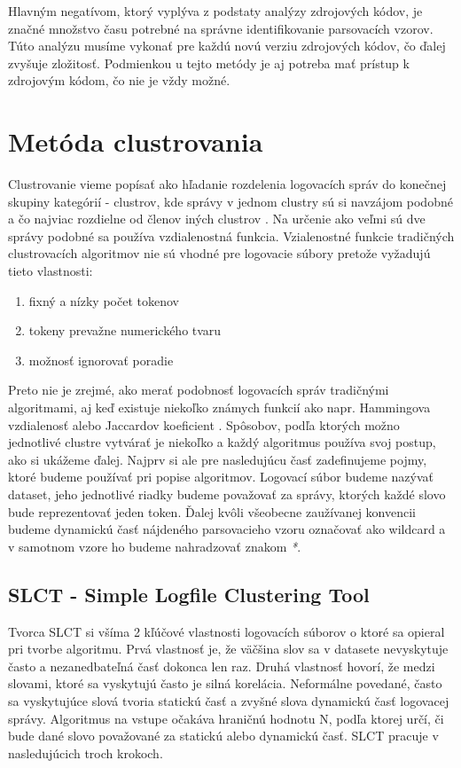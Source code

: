 Hlavným negatívom, ktorý vyplýva z podstaty analýzy zdrojových kódov, je značné množstvo času potrebné na správne identifikovanie parsovacích vzorov. Túto analýzu musíme vykonať pre každú novú verziu zdrojových kódov, čo ďalej zvyšuje zložitosť. Podmienkou u tejto metódy je aj potreba mať prístup k zdrojovým kódom, čo nie je vždy možné. 

\section{ Metóda clustrovania}

Clustrovanie vieme popísať ako hľadanie rozdelenia logovacích správ do konečnej skupiny kategórií - clustrov, kde správy v jednom clustry sú si navzájom podobné a čo najviac rozdielne od členov iných clustrov  \parencite{iplom} . Na určenie ako veľmi sú dve správy podobné sa používa vzdialenostná funkcia. Vzialenostné funkcie tradičných clustrovacích algoritmov nie sú vhodné pre logovacie súbory pretože vyžadujú tieto vlastnosti:

\begin{enumerate}
  \item fixný a nízky počet tokenov
  \item tokeny prevažne numerického tvaru
  \item možnosť ignorovať poradie
\end{enumerate}

Preto nie je zrejmé, ako merať podobnosť logovacích správ tradičnými algoritmami, aj keď existuje niekoľko známych funkcií ako napr. Hammingova vzdialenosť alebo Jaccardov koeficient \parencite{slct}. Spôsobov, podľa ktorých možno jednotlivé clustre vytvárať je niekoľko a každý algoritmus používa svoj postup, ako si ukážeme ďalej. Najprv si ale pre nasledujúcu časť zadefinujeme pojmy, ktoré budeme používať pri popise algoritmov. Logovací súbor budeme nazývať dataset, jeho jednotlivé riadky budeme považovať za správy, ktorých každé slovo bude reprezentovať jeden token. Ďalej kvôli všeobecne zaužívanej konvencii budeme dynamickú časť nájdeného parsovacieho vzoru označovať ako wildcard a v samotnom vzore ho budeme nahradzovať znakom \emph{*}.

\subsection{SLCT - Simple Logfile Clustering Tool}
Tvorca SLCT \parencite{slct, slctloghound} si všíma 2 kľúčové vlastnosti logovacích súborov o ktoré sa opieral pri tvorbe algoritmu. Prvá vlastnosť je, že väčšina slov sa v datasete nevyskytuje často a nezanedbateľná časť dokonca len raz. Druhá vlastnosť hovorí, že medzi slovami, ktoré sa vyskytujú často je silná korelácia. Neformálne povedané, často sa vyskytujúce slová tvoria statickú časť a zvyšné slova dynamickú časť logovacej správy. Algoritmus na vstupe očakáva hraničnú hodnotu N, podľa ktorej určí, či bude dané slovo považované za statickú alebo dynamickú časť.  SLCT pracuje v nasledujúcich troch krokoch.

